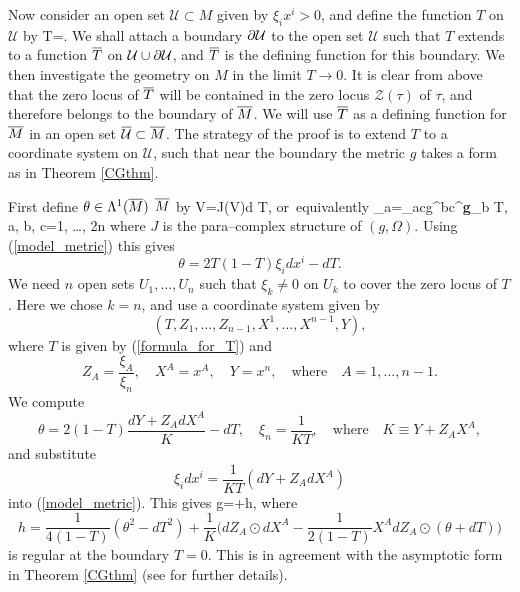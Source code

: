 Now consider an open set  ${\mathcal U}\subset M$ given
by  $\xi_ix^i>0$, and define the function $T$ on ${\mathcal U}$ by
\be
\label{formula_for_T}
T=.
\ee
We shall attach a boundary  $\partial \mathcal{U}$ to the open set $\mathcal{U}$ 
such that $T$ extends to a function $\overline{T}$ on $\mathcal{U}\cup \partial \mathcal{U}$, and
$\overline{T}$ is  the defining function for this boundary.
We then investigate the geometry on $M$ in the limit $T\rightarrow 0$.
It is clear from above that
the zero locus of $\overline{T}$ will be contained in the zero locus $\mathcal{Z}(\tau)$ of $\tau$, and
therefore belongs to the boundary of $\overline{M}$. We will 
use $\overline{T}$ as a defining function for $\overline{M}$ in an open set $\overline{\mathcal{U}}\subset\overline{M}$.
The strategy of the proof is to extend $T$ to a coordinate system on 
$\mathcal{U}$, such that near the boundary the metric $g$ takes a form
as in Theorem \ref{CGthm}.


First define $\theta\in \Lambda^1(\overline{M})$ $\overline{M}$
by 
\be
\label{def_theta}
V\hook \theta=J(V)\hook d T, \quad\mbox{or equivalently}\quad 
\theta_a=\Omega_{ac}g^{bc}{{\nabla}^{\bf g}}_b T, \quad a, b, c=1, \dots, 2n
\ee
where $J$ is the para--complex structure of $(g,  \Omega)$. Using (\ref{model_metric}) this  gives
\[
\theta=2T(1-T)\xi_id x^i-dT.
\]
We need $n$  open sets $U_1, \dots, U_n$ such that $\xi_k\neq 0$ on $U_k$
to cover the zero locus of $T$. Here we chose $k=n$, and use
a coordinate system given by
\[
(T, Z_1, \dots, Z_{n-1}, X^1, \dots,
 X^{n-1}, Y),
\] 
where $T$ is
given by (\ref{formula_for_T}) and
\[
Z_A=\frac {\xi_A}{\xi_n}, \quad X^A=x^A, \quad Y=x^{n}, \quad\mbox{where}\quad
A=1, \dots, n-1.
\]
We compute
\[
\theta=2(1-T)\frac{dY+Z_AdX^A}{K}-dT, \quad
\xi_n=\frac{1}{KT}, \quad \mbox{where}\quad K\equiv Y+Z_AX^A,
\]
and substitute
\[
\xi_i dx^i=\frac{1}{KT}(dY+Z_AdX^A)
\]
into (\ref{model_metric}). This gives
\be
\label{CG_Form}
g=+h,
\ee
where 
\[
h=\frac{1}{4(1-T)}(\theta^2-dT^2)+\frac{1}{K}\Big(dZ_A\odot dX^A-\frac{1}{2(1-T)}X^A dZ_A\odot(\theta+dT)\Big)
\]
is regular at the boundary $T=0$. This is in agreement with the 
asymptotic form in Theorem \ref{CGthm} (see \cite{CG} for further details).

